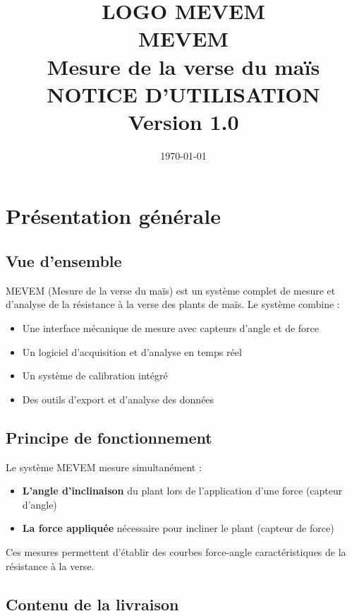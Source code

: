 \documentclass[12pt,a4paper]{article}
\title{%
    \vspace{-2cm}
    {\Large LOGO MEVEM}\\[1cm]
    {\Huge \textbf{MEVEM}}\\[0.5cm]
    {\Large Mesure de la verse du maïs}\\[0.3cm]
    {\Large \textbf{NOTICE D'UTILISATION}}\\[0.5cm]
    {\normalsize Version 1.0}
}
\author{}
\date{\today}
\begin{document}
\maketitle
\thispagestyle{empty}

\newpage
\tableofcontents
\newpage

\section{Présentation générale}

\subsection{Vue d'ensemble}

MEVEM (Mesure de la verse du maïs) est un système complet de mesure et d'analyse de la résistance à la verse des plants de maïs. Le système combine :

\begin{itemize}
    \item Une interface mécanique de mesure avec capteurs d'angle et de force
    \item Un logiciel d'acquisition et d'analyse en temps réel
    \item Un système de calibration intégré
    \item Des outils d'export et d'analyse des données
\end{itemize}

\subsection{Principe de fonctionnement}

Le système MEVEM mesure simultanément :
\begin{itemize}
    \item \textbf{L'angle d'inclinaison} du plant lors de l'application d'une force (capteur d'angle)
    \item \textbf{La force appliquée} nécessaire pour incliner le plant (capteur de force)
\end{itemize}

Ces mesures permettent d'établir des courbes force-angle caractéristiques de la résistance à la verse.

\subsection{Contenu de la livraison}
\end{document}
